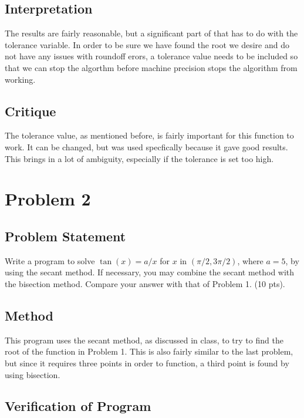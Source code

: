 \documentclass[10pt,letter]{article}
\begin{document}
\subsection{Interpretation}

The results are fairly reasonable, but a significant part of that has to do with the tolerance variable. In order to be sure we have found the root we desire and do not have any issues with roundoff erors, a tolerance value needs to be included so that we can stop the algorthm before machine precision stops the algorithm from working.

\subsection{Critique}

The tolerance value, as mentioned before, is fairly important for this function to work. It can be changed, but was used specfically because it gave good results. This brings in a lot of ambiguity, especially if the tolerance is set too high.

\pagebreak

\section{Problem 2}

\subsection{Problem Statement}

Write a program to solve $\tan(x) = a/x$ for $x$ in $(\pi/2, 3\pi/2)$, where $a = 5$, by using the secant method.
If necessary, you may combine the secant method with the bisection method. Compare your answer
with that of Problem 1. (10 pts).

\subsection{Method}

This program uses the secant method, as discussed in class, to try to find the root of the function in Problem 1. This is also fairly similar to the last problem, but since it requires three points in order to function, a third point is found by using bisection.

\subsection{Verification of Program}
\end{document}
